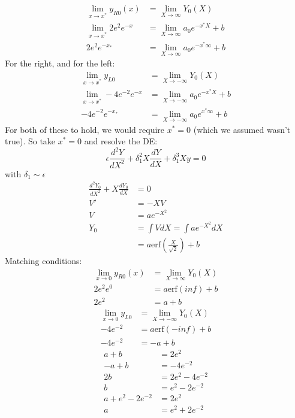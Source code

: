 \documentclass{X:/Documents/Coding/Latex/myassignment}
\begin{document}
\begin{enumerate}
	\begin{align*}
		\lim_{x\to x^*} y_{R0}(x)&=\lim_{X\to \infty} Y_0(X)\\
		\lim_{x\to x^*} 2e^2e^{-x} &= \lim_{X\to \infty} a_0 e^{-x^* X} +b\\
		2e^2e^{-x_*} &= \lim_{X\to \infty} a_0 e^{-x^* \infty} +b
	\end{align*}
	For the right, and for the left:
	\begin{align*}
		\lim_{x\to x^*} y_{L0}&=\lim_{X\to -\infty} Y_0(X) \\
		\lim_{x\to x^*} -4e^{-2}e^{-x} &= \lim_{X\to -\infty} a_0 e^{-x^* X} +b\\
		-4e^{-2}e^{-x_*} &= \lim_{X\to -\infty} a_0 e^{x^* \infty} +b
	\end{align*}
	For both of these to hold, we would require $x^* = 0$ (which we assumed wasn't true). So take $x^* = 0$ and resolve the DE:
	\[\epsilon \frac{d^2Y}{dX^2} + \delta_1^2 X \frac{dY}{dX} + \delta_1^3 Xy = 0 \]
	with $\delta_1 \sim \epsilon$
	\begin{align*}
		\frac{d^2Y_0}{dX^2} +  X \frac{dY_0}{dX} &= 0 \\
		V' &= -XV\\
		V &= ae^{-X^2}\\
		Y_0 &= \int V dX= \int ae^{-X^2} dX\\
		&= a \mathrm{erf}(\frac{X}{\sqrt2}) + b
	\end{align*}
	Matching conditions:
	\begin{align*}
		\lim_{x\to 0} y_{R0}(x)&=\lim_{X\to \infty} Y_0(X)\\
		2e^2e^{0} &= a\mathrm{erf}(inf) + b\\
		2e^2 &= a + b
	\end{align*}
	\begin{align*}
		\lim_{x\to 0} y_{L0}&=\lim_{X\to -\infty} Y_0(X) \\
		-4e^{-2} &=  a\mathrm{erf}(-inf) + b\\
		-4e^{-2} &=  -a + b
	\end{align*}
	\begin{align*}
		 a + b &= 2e^2\\
		-a + b &= -4e^{-2}\\
		2b &= 2e^{2} - 4e^{-2}\\
		b &= e^{2} - 2e^{-2}\\
		a + e^{2} - 2e^{-2} &= 2e^{2}\\
		a &= e^{2} + 2e^{-2}
	\end{align*}


\end{enumerate}
\end{document}
